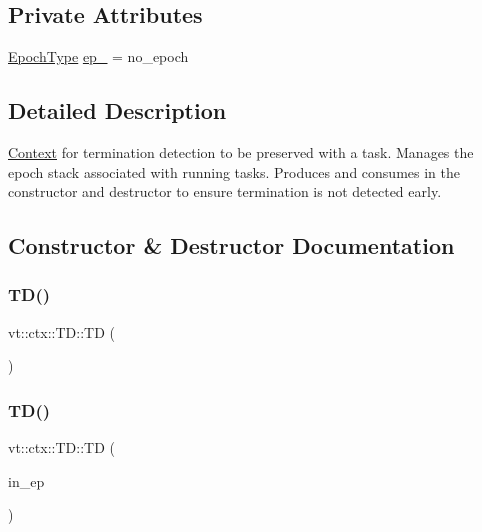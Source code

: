 \subsection*{Private Attributes}
\begin{DoxyCompactItemize}
\item 
\hyperlink{namespacevt_a81d11b28122d43bf9834577e4a06440f}{Epoch\+Type} \hyperlink{structvt_1_1ctx_1_1_t_d_a27c1d8888dd9b0fcc0b6a8f31f7ebdb7}{ep\+\_\+} = no\+\_\+epoch
\end{DoxyCompactItemize}


\subsection{Detailed Description}
\hyperlink{structvt_1_1ctx_1_1_context}{Context} for termination detection to be preserved with a task. Manages the epoch stack associated with running tasks. Produces and consumes in the constructor and destructor to ensure termination is not detected early. 

\subsection{Constructor \& Destructor Documentation}
\mbox{\label{structvt_1_1ctx_1_1_t_d_a1cb75bb3a0803da9cc471b675aa9124e}} 
\subsubsection{\texorpdfstring{T\+D()}{TD()}\hspace{0.1cm}{\footnotesize\ttfamily [1/3]}}
{\footnotesize\ttfamily vt\+::ctx\+::\+T\+D\+::\+TD (\begin{DoxyParamCaption}{ }\end{DoxyParamCaption})\hspace{0.3cm}{\ttfamily [default]}}

\mbox{\label{structvt_1_1ctx_1_1_t_d_ade8d2b390d1b4a484dd9f5f20546bc91}} 
\subsubsection{\texorpdfstring{T\+D()}{TD()}\hspace{0.1cm}{\footnotesize\ttfamily [2/3]}}
{\footnotesize\ttfamily vt\+::ctx\+::\+T\+D\+::\+TD (\begin{DoxyParamCaption}\item[{\hyperlink{namespacevt_a81d11b28122d43bf9834577e4a06440f}{Epoch\+Type}}]{in\+\_\+ep }\end{DoxyParamCaption})\hspace{0.3cm}{\ttfamily [explicit]}}



